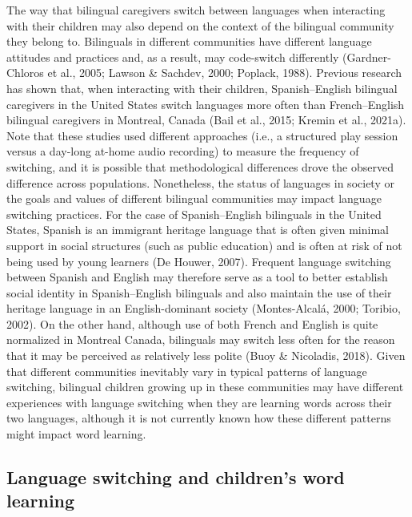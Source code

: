 \documentclass[
  man,floatsintext]{apa7}
\begin{document}
The way that bilingual caregivers switch between languages when interacting with their children may also depend on the context of the bilingual community they belong to. Bilinguals in different communities have different language attitudes and practices and, as a result, may code-switch differently (Gardner-Chloros et al., 2005; Lawson \& Sachdev, 2000; Poplack, 1988). Previous research has shown that, when interacting with their children, Spanish--English bilingual caregivers in the United States switch languages more often than French--English bilingual caregivers in Montreal, Canada (Bail et al., 2015; Kremin et al., 2021a). Note that these studies used different approaches (i.e., a structured play session versus a day-long at-home audio recording) to measure the frequency of switching, and it is possible that methodological differences drove the observed difference across populations. Nonetheless, the status of languages in society or the goals and values of different bilingual communities may impact language switching practices. For the case of Spanish--English bilinguals in the United States, Spanish is an immigrant heritage language that is often given minimal support in social structures (such as public education) and is often at risk of not being used by young learners (De Houwer, 2007). Frequent language switching between Spanish and English may therefore serve as a tool to better establish social identity in Spanish--English bilinguals and also maintain the use of their heritage language in an English-dominant society (Montes-Alcalá, 2000; Toribio, 2002). On the other hand, although use of both French and English is quite normalized in Montreal Canada, bilinguals may switch less often for the reason that it may be perceived as relatively less polite (Buoy \& Nicoladis, 2018). Given that different communities inevitably vary in typical patterns of language switching, bilingual children growing up in these communities may have different experiences with language switching when they are learning words across their two languages, although it is not currently known how these different patterns might impact word learning.

\hypertarget{language-switching-and-childrens-word-learning}{%
\subsection{Language switching and children's word learning}\label{language-switching-and-childrens-word-learning}}
\end{document}
